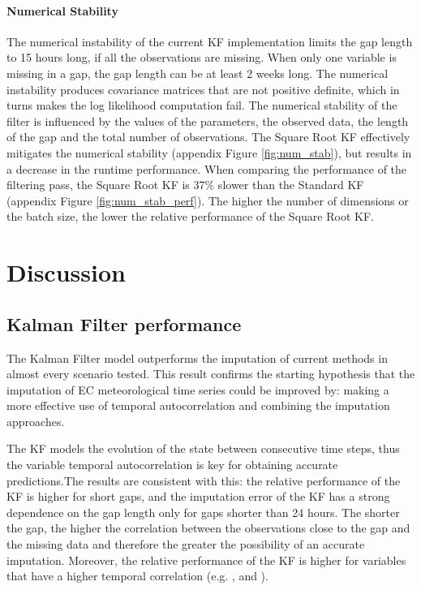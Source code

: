 \documentclass{article}
\let\Oldsection\section
\renewcommand{\section}{\FloatBarrier\Oldsection}
\let\Oldsubsection\subsection
\renewcommand{\subsection}{\FloatBarrier\Oldsubsection}
\begin{document}
\paragraph{Numerical Stability} The numerical instability of the current KF implementation limits the gap length to 15 hours long, if all the observations are missing. When only one variable is missing in a gap, the gap length can be at least 2 weeks long.
The numerical instability produces covariance matrices that are not positive definite, which in turns makes the log likelihood computation fail. The numerical stability of the filter is influenced by the values of the parameters, the observed data, the length of the gap and the total number of observations.
The Square Root KF effectively mitigates the numerical stability (appendix Figure \ref{fig:num_stab}), but results in a decrease in the runtime performance. When comparing the performance of the filtering pass, the Square Root KF is 37\% slower than the Standard KF (appendix Figure \ref{fig:num_stab_perf}). The higher the number of dimensions or the batch size, the lower the relative performance of the Square Root KF.

\section{Discussion}

\subsection{Kalman Filter performance}

The Kalman Filter model outperforms the imputation of current methods in almost every scenario tested. This result confirms the starting hypothesis that the imputation of EC meteorological time series could be improved by: making a more effective use of temporal autocorrelation and combining the imputation approaches.

The KF models the evolution of the state between consecutive time steps, thus the variable temporal autocorrelation is key for obtaining accurate predictions.The results are consistent with this: the relative performance of the KF is higher for short gaps, and the imputation error of the KF has a strong dependence on the gap length only for gaps shorter than 24 hours.  The shorter the gap, the higher the correlation between the observations close to the gap and the missing data and therefore the greater the possibility of an accurate imputation. Moreover, the relative performance of the KF is higher for variables that have a higher temporal correlation (e.g. ,  and ).
\end{document}
